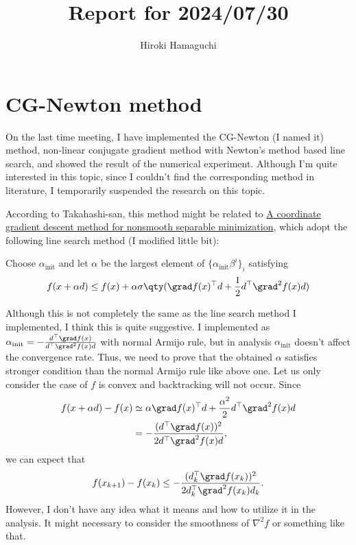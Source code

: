 \documentclass[\main/main]{subfiles}
\begin{document}
\title{Report for 2024/07/30}
\author{Hiroki Hamaguchi}
\maketitle

\section{CG-Newton method}

On the last time meeting, I have implemented the CG-Newton (I named it) method, non-linear conjugate gradient method with Newton's method based line search, and showed the result of the numerical experiment.
Although I'm quite interested in this topic, since I couldn't find the corresponding method in literature, I temporarily suspended the research on this topic.

According to Takahashi-san, this method might be related to \href{https://link-springer-com.utokyo.idm.oclc.org/article/10.1007/s10107-007-0170-0}{A coordinate gradient descent method for nonsmooth separable minimization}, which adopt the following line search method (I modified little bit):
\begin{screen}
  Choose $\alpha_{\mathrm{init}}$ and let $\alpha$ be the largest element of $\{ \alpha_{\mathrm{init}} \beta^i \}_{i}$ satisfying
  \begin{equation*}
    f(x+\alpha d) \leq f(x) + \alpha \sigma \qty(\grad f(x)^\top d+ \frac{1}{2} d^\top \grad^2 f(x) d)
  \end{equation*}
\end{screen}
Although this is not completely the same as the line search method I implemented, I think this is quite suggestive.
I implemented as $\alpha_{\mathrm{init}} = -\frac{d^\top \grad f(x)}{d^\top \grad^2 f(x) d}$ with normal Armijo rule, but in analysis $\alpha_{\mathrm{init}}$ doesn't affect the convergence rate. Thus, we need to prove that the obtained $\alpha$ satisfies stronger condition than the normal Armijo rule like above one.
Let us only consider the case of $f$ is convex and backtracking will not occur. Since
\begin{align*}
  f(x+\alpha d) - f(x) & \simeq \alpha \grad f(x)^\top d + \frac{\alpha^2}{2} d^\top \grad^2 f(x) d \\
                       & = -\frac{(d^\top \grad f(x))^2}{2d^\top \grad^2 f(x) d},
\end{align*}
we can expect that
\begin{equation*}
  f(x_{k+1}) - f(x_k) \leq -\frac{(d_k^\top \grad f(x_k))^2}{2d_k^\top \grad^2 f(x_k) d_k}.
\end{equation*}
However, I don't have any idea what it means and how to utilize it in the analysis.
It might necessary to consider the smoothness of $\nabla^2 f$ or something like that.
\end{document}
